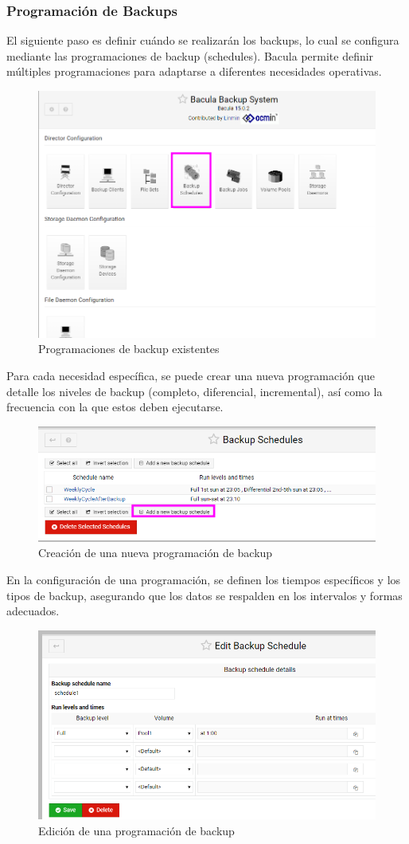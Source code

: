 \subsubsection{Programación de Backups}
El siguiente paso es definir cuándo se realizarán los backups, lo cual se configura mediante las programaciones de backup (schedules). Bacula permite definir múltiples programaciones para adaptarse a diferentes necesidades operativas.

\begin{figure}[H]
    \centering
    \includegraphics[width=0.5\linewidth]{instalacionBacula/schedule.png}
    \caption{Programaciones de backup existentes}
\end{figure}

Para cada necesidad específica, se puede crear una nueva programación que detalle los niveles de backup (completo, diferencial, incremental), así como la frecuencia con la que estos deben ejecutarse.

\begin{figure}[H]
    \centering
    \includegraphics[width=0.5\linewidth]{instalacionBacula/newBackupSchedules.png}
    \caption{Creación de una nueva programación de backup}
\end{figure}

En la configuración de una programación, se definen los tiempos específicos y los tipos de backup, asegurando que los datos se respalden en los intervalos y formas adecuados.

\begin{figure}[H]
    \centering
    \includegraphics[width=0.5\linewidth]{instalacionBacula/editbuckupschedule.png}
    \caption{Edición de una programación de backup}
\end{figure}






